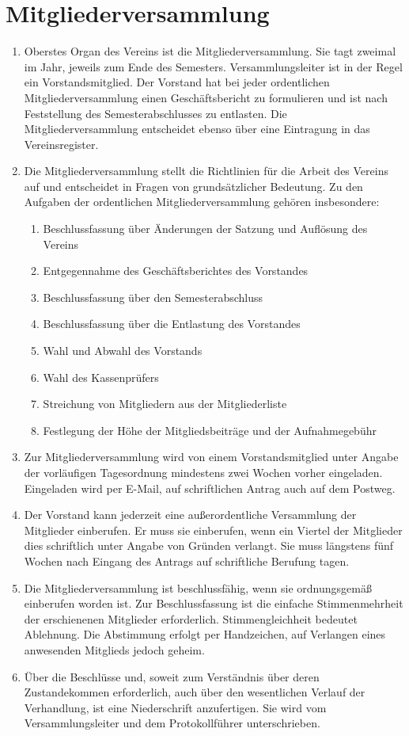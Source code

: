 \documentclass{article}
\begin{document}
\section{Mitgliederversammlung}
\label{sec:mitgliederversammlung}
\begin{enumerate}
	\item Oberstes Organ des Vereins ist die Mitgliederversammlung. Sie tagt zweimal im Jahr, jeweils zum Ende des Semesters. Versammlungsleiter ist in der Regel ein Vorstandsmitglied. Der Vorstand hat bei jeder ordentlichen Mitgliederversammlung einen Geschäftsbericht zu formulieren und ist nach Feststellung des Semesterabschlusses zu entlasten. Die Mitgliederversammlung entscheidet ebenso über eine Eintragung in das  Vereinsregister.
	\item Die Mitgliederversammlung stellt die Richtlinien für die Arbeit des Vereins auf und  entscheidet in Fragen von grundsätzlicher Bedeutung. Zu den Aufgaben der  ordentlichen Mitgliederversammlung gehören insbesondere:
	\begin{enumerate}
		\item Beschlussfassung über Änderungen der Satzung und Auflösung des Vereins
		\item Entgegennahme des Geschäftsberichtes des Vorstandes
		\item Beschlussfassung über den Semesterabschluss
		\item Beschlussfassung über die Entlastung des Vorstandes
		\item Wahl und Abwahl des Vorstands
		\item Wahl des Kassenprüfers
		\item Streichung von Mitgliedern aus der Mitgliederliste
		\item Festlegung der Höhe der Mitgliedsbeiträge und der Aufnahmegebühr
	\end{enumerate}
	\item Zur Mitgliederversammlung wird von einem Vorstandsmitglied unter Angabe der  vorläufigen Tagesordnung mindestens zwei Wochen vorher eingeladen. Eingeladen
 wird per E-Mail, auf schriftlichen Antrag auch auf dem Postweg.
 \item Der Vorstand kann jederzeit eine außerordentliche Versammlung der Mitglieder  einberufen. Er muss sie einberufen, wenn ein Viertel der Mitglieder dies schriftlich  unter Angabe von Gründen verlangt. Sie muss längstens fünf Wochen nach Eingang  des Antrags auf schriftliche Berufung tagen.
 \item Die Mitgliederversammlung ist beschlussfähig, wenn sie ordnungsgemäß einberufen worden ist. Zur Beschlussfassung ist die einfache Stimmenmehrheit der erschienenen Mitglieder erforderlich. Stimmengleichheit bedeutet Ablehnung. Die Abstimmung erfolgt per Handzeichen, auf Verlangen eines anwesenden Mitglieds jedoch geheim.
 \item Über die Beschlüsse und, soweit zum Verständnis über deren Zustandekommen  erforderlich, auch über den wesentlichen Verlauf der Verhandlung, ist eine Niederschrift anzufertigen. Sie wird vom Versammlungsleiter und dem Protokollführer unterschrieben.
\end{enumerate}
\end{document}
